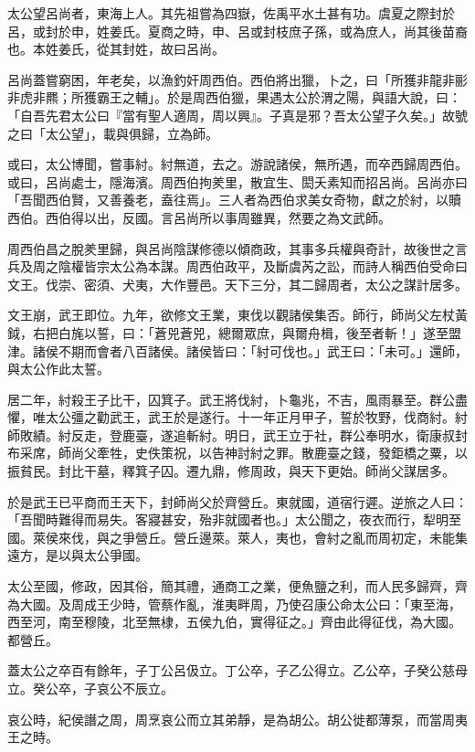 
\begin{pinyinscope}
太公望呂尚者，東海上人。其先祖嘗為四嶽，佐禹平水土甚有功。虞夏之際封於呂，或封於申，姓姜氏。夏商之時，申、呂或封枝庶子孫，或為庶人，尚其後苗裔也。本姓姜氏，從其封姓，故曰呂尚。

呂尚蓋嘗窮困，年老矣，以漁釣奸周西伯。西伯將出獵，卜之，曰「所獲非龍非彨非虎非羆；所獲霸王之輔」。於是周西伯獵，果遇太公於渭之陽，與語大說，曰：「自吾先君太公曰『當有聖人適周，周以興』。子真是邪？吾太公望子久矣。」故號之曰「太公望」，載與俱歸，立為師。

或曰，太公博聞，嘗事紂。紂無道，去之。游說諸侯，無所遇，而卒西歸周西伯。或曰，呂尚處士，隱海濱。周西伯拘羑里，散宜生、閎夭素知而招呂尚。呂尚亦曰「吾聞西伯賢，又善養老，盍往焉」。三人者為西伯求美女奇物，獻之於紂，以贖西伯。西伯得以出，反國。言呂尚所以事周雖異，然要之為文武師。

周西伯昌之脫羑里歸，與呂尚陰謀修德以傾商政，其事多兵權與奇計，故後世之言兵及周之陰權皆宗太公為本謀。周西伯政平，及斷虞芮之訟，而詩人稱西伯受命曰文王。伐崇、密須、犬夷，大作豐邑。天下三分，其二歸周者，太公之謀計居多。

文王崩，武王即位。九年，欲修文王業，東伐以觀諸侯集否。師行，師尚父左杖黃鉞，右把白旄以誓，曰：「蒼兕蒼兕，總爾眾庶，與爾舟楫，後至者斬！」遂至盟津。諸侯不期而會者八百諸侯。諸侯皆曰：「紂可伐也。」武王曰：「未可。」還師，與太公作此太誓。

居二年，紂殺王子比干，囚箕子。武王將伐紂，卜龜兆，不吉，風雨暴至。群公盡懼，唯太公彊之勸武王，武王於是遂行。十一年正月甲子，誓於牧野，伐商紂。紂師敗績。紂反走，登鹿臺，遂追斬紂。明日，武王立于社，群公奉明水，衛康叔封布采席，師尚父牽牲，史佚策祝，以告神討紂之罪。散鹿臺之錢，發鉅橋之粟，以振貧民。封比干墓，釋箕子囚。遷九鼎，修周政，與天下更始。師尚父謀居多。

於是武王已平商而王天下，封師尚父於齊營丘。東就國，道宿行遲。逆旅之人曰：「吾聞時難得而易失。客寢甚安，殆非就國者也。」太公聞之，夜衣而行，犁明至國。萊侯來伐，與之爭營丘。營丘邊萊。萊人，夷也，會紂之亂而周初定，未能集遠方，是以與太公爭國。

太公至國，修政，因其俗，簡其禮，通商工之業，便魚鹽之利，而人民多歸齊，齊為大國。及周成王少時，管蔡作亂，淮夷畔周，乃使召康公命太公曰：「東至海，西至河，南至穆陵，北至無棣，五侯九伯，實得征之。」齊由此得征伐，為大國。都營丘。

蓋太公之卒百有餘年，子丁公呂伋立。丁公卒，子乙公得立。乙公卒，子癸公慈母立。癸公卒，子哀公不辰立。

哀公時，紀侯譖之周，周烹哀公而立其弟靜，是為胡公。胡公徙都薄泵，而當周夷王之時。


\end{pinyinscope}
